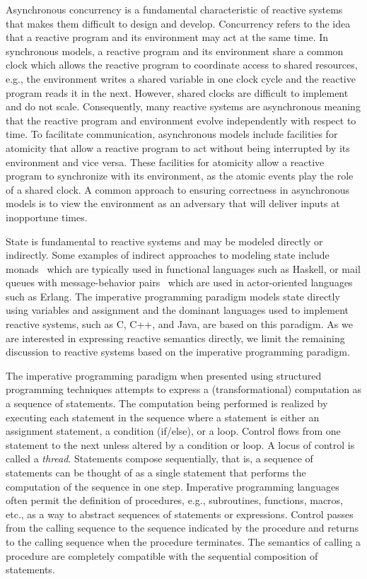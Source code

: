 Asynchronous concurrency is a fundamental characteristic of reactive systems that makes them difficult to design and develop.
Concurrency refers to the idea that a reactive program and its environment may act at the same time.
In synchronous models, a reactive program and its environment share a common clock which allows the reactive program to coordinate access to shared resources, e.g., the environment writes a shared variable in one clock cycle and the reactive program reads it in the next.
However, shared clocks are difficult to implement and do not scale.
Consequently, many reactive systems are asynchronous meaning that the reactive program and environment evolve independently with respect to time.
To facilitate communication, asynchronous models include facilities for atomicity that allow a reactive program to act without being interrupted by its environment and vice versa.
These facilities for atomicity allow a reactive program to synchronize with its environment, as the atomic events play the role of a shared clock.
A common approach to ensuring correctness in asynchronous models is to view the environment as an adversary that will deliver inputs at inopportune times.

State is fundamental to reactive systems and may be modeled directly or indirectly.
Some examples of indirect approaches to modeling state include monads~\cite{wadler1990comprehending} which are typically used in functional languages such as Haskell, or mail queues with message-behavior pairs~\cite{agha1985actors} which are used in actor-oriented languages such as Erlang.
The imperative programming paradigm models state directly using variables and assignment and the dominant languages used to implement reactive systems, such as C, C++, and Java, are based on this paradigm.
As we are interested in expressing reactive semantics directly, we limit the remaining discussion to reactive systems based on the imperative programming paradigm.

The imperative programming paradigm when presented using structured programming techniques attempts to express a (transformational) computation as a sequence of statements.
The computation being performed is realized by executing each statement in the sequence where a statement is either an assignment statement, a condition (if/else), or a loop.
Control flows from one statement to the next unless altered by a condition or loop.
A locus of control is called a \emph{thread}.
Statements compose sequentially, that is, a sequence of statements can be thought of as a single statement that performs the computation of the sequence in one step.
Imperative programming languages often permit the definition of procedures, e.g., subroutines, functions, macros, etc., as a way to abstract sequences of statements or expressions.
Control passes from the calling sequence to the sequence indicated by the procedure and returns to the calling sequence when the procedure terminates.
The semantics of calling a procedure are completely compatible with the sequential composition of statements.

